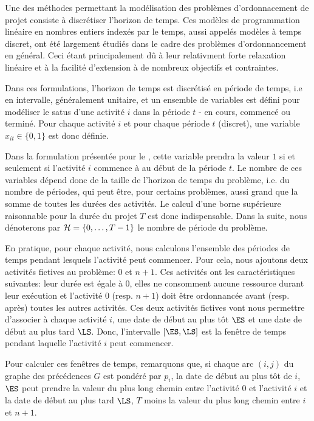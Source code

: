 Une des méthodes permettant la modélisation des problèmes
d'ordonnacement de projet consiste à discrétiser l'horizon de
temps. Ces modèles de programmation linéaire en nombres entiers
indexés par le temps, aussi appelés modèles à temps discret, ont été
largement étudiés dans le cadre des problèmes d'ordonnancement en
général. Ceci étant principalement dû à leur relativment forte
relaxation linéaire et à la facilité d’extension à de nombreux
objectifs et contraintes.

Dans ces formulations, l'horizon de temps est discrétisé en période de
temps, i.e en intervalle, généralement unitaire, et un
ensemble de variables est défini pour modéliser le satus d'une
activité $i$ dans la période $t$ - en cours, commencé ou terminé. Pour
chaque activité $i$ et pour chaque période $t$ (discret), une variable
$x_{it} \in \{0,1\}$ est donc définie.

Dans la formulation présentée pour le \RCPSP, cette variable prendra
la valeur $1$ si et seulement si l'activité $i$ commence à au début de
la période $t$. Le nombre de ces variables dépend donc de la taille de
l'horizon de temps du problème, i.e. du nombre de périodes, qui peut
être, pour certains problèmes, aussi grand que la somme de toutes les
durées des activités. Le calcul d'une borne supérieure raisonnable
pour la durée du projet $T$ est donc indispensable.  Dans la suite,
nous dénoterons par ${\cal H}=\{0,\dots,T-1\}$ le nombre de période du
problème.

En pratique, pour chaque activité, nous calculons l'ensemble des
périodes de temps pendant lesquels l'activité peut commencer. Pour
cela, nous ajoutons deux activités fictives au problème: $0$ et
$n+1$. Ces activités ont les caractéristiques suivantes: leur
durée est égale à 0, elles ne consomment aucune ressource durant
leur exécution et l'activité $0$ (resp. $n+1$) doit être
ordonnancée avant (resp. après) toutes les autres activités. Ces
deux activités fictives vont nous permettre d'associer à chaque
activité $i$, une date de début au plus tôt $\ES$ et une date de
début au plus tard $\LS$. Donc, l'intervalle $[\ES,\LS]$ est la
fenêtre de temps pendant laquelle l'activité $i$ peut commencer.

Pour calculer ces fenêtres de temps, remarquons que, si chaque
arc $(i,j)$ du graphe des précédences $G$ est pondéré par
$p_i$, la date de début au plus tôt de $i$, $\ES$ peut prendre la
valeur du plus long chemin entre l'activité $0$ et l'activité $i$
et la date de début au plus tard $\LS$, $T$ moins la valeur du
plus long chemin entre $i$ et $n+1$.

